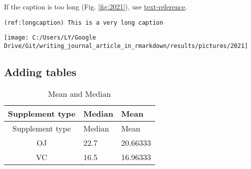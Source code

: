 \documentclass[review]{elsarticle} %
\newenvironment{Shaded}{\begin{snugshade}}{\end{snugshade}}
\newcommand{\BaseNTok}[1]{\textcolor[rgb]{0.00,0.00,0.81}{#1}}
\newcommand{\NormalTok}[1]{#1}
\let\origfigure\figure
\let\endorigfigure\endfigure
\renewenvironment{figure}[1][2] {
    \expandafter\origfigure\expandafter[H]
} {
    \endorigfigure
}
\begin{document}
If the caption is too long (Fig. \ref{fig:2021}), use
\href{https://bookdown.org/yihui/rmarkdown/bookdown-markdown.html\#text-references}{text-reference}.

\texttt{(ref:longcaption)\ This\ is\ a\ very\ long\ caption}

\begin{Shaded}
\end{Shaded}



\begin{figure}

{\centering \texttt{[image: C:/Users/LY/Google Drive/Git/writing\_journal\_article\_in\_rmarkdown/results/pictures/2021]} 

}

\caption{This is a very long caption}\label{fig:2021}
\end{figure}

\subsection{Adding tables}\label{table}

\begin{Shaded}
\end{Shaded}

\begin{longtable}[]{@{}cll@{}}
\caption{\label{tab:unnamed-chunk-2}\label{tab:cooltable}Mean and
Median}\tabularnewline
\toprule
Supplement type & Median & Mean\tabularnewline
\midrule
\endfirsthead
\toprule
Supplement type & Median & Mean\tabularnewline
\midrule
\endhead
OJ & 22.7 & 20.66333\tabularnewline
VC & 16.5 & 16.96333\tabularnewline
\bottomrule
\end{longtable}
\end{document}
